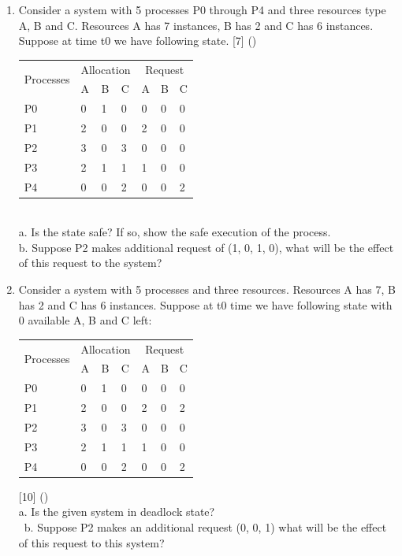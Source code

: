 \documentclass[12pt]{article}
\begin{document}
\begin{enumerate}
			\item Consider a system with 5 processes P0 through P4 and three resources type A, B and C. Resources A has 7 instances, B has 2 and C has 6 instances. Suppose at time t0 we have following state. \hfill [7] ()\\
			\begin{tabular}{|p{17mm}|p{7mm}|p{7mm}|p{7mm}|p{7mm}|p{7mm}|p{7mm}|}
				\hline
				\multirow{2}{*}{Processes} & \multicolumn{3}{|c|}{Allocation} & \multicolumn{3}{|c|}{Request} \\ \cline{2-7}
				& A & B & C & A & B & C \\ \hline
				P0 & 0 & 1 & 0 & 0 & 0 & 0 \\ \hline
				P1 & 2 & 0 & 0 & 2 & 0 & 0 \\ \hline
				P2 & 3 & 0 & 3 & 0 & 0 & 0 \\ \hline
				P3 & 2 & 1 & 1 & 1 & 0 & 0 \\ \hline
				P4 & 0 & 0 & 2 & 0 & 0 & 2 \\ \hline
			\end{tabular}\\
			a. Is the state safe? If so, show the safe execution of the process.\\
			b. Suppose P2 makes additional request of (1, 0, 1, 0), what will be the effect of this request to the system?

			\item Consider a system with 5 processes and three resources. Resources A has 7, B has 2 and C has 6 instances. Suppose at t0 time we have following state with 0 available A, B and C left:\\
			\begin{tabular}{|p{17mm}|p{7mm}|p{7mm}|p{7mm}|p{7mm}|p{7mm}|p{7mm}|}
				\hline
				\multirow{2}{*}{Processes} & \multicolumn{3}{|c|}{Allocation} & \multicolumn{3}{|c|}{Request} \\ \cline{2-7}
				& A & B & C & A & B & C \\ \hline
				P0 & 0 & 1 & 0 & 0 & 0 & 0 \\ \hline
				P1 & 2 & 0 & 0 & 2 & 0 & 2 \\ \hline
				P2 & 3 & 0 & 3 & 0 & 0 & 0 \\ \hline
				P3 & 2 & 1 & 1 & 1 & 0 & 0 \\ \hline
				P4 & 0 & 0 & 2 & 0 & 0 & 2 \\ \hline
			\end{tabular} \hfill [10] ()\\
			a. Is the given system in deadlock state?\\\
			b. Suppose P2 makes an additional request (0, 0, 1) what will be the effect of this request to this system?


\end{enumerate}
\end{document}
